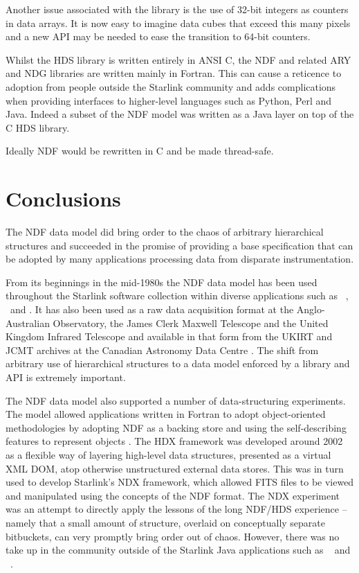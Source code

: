 \documentclass[final,authoryear,5p,times,twocolumn]{elsarticle}
\begin{document}
Another issue associated with the library is the use of 32-bit
integers as counters in data arrays. It is now easy to imagine data
cubes that exceed this many pixels and a new API may be needed to ease
the transition to 64-bit counters.

Whilst the HDS library is written entirely in ANSI C, the NDF and
related ARY \citep{SUN11} and NDG \citep{SUN2} libraries are written
mainly in Fortran.
This can cause a reticence to adoption from people outside the Starlink community and
adds complications when providing interfaces to higher-level languages
such as Python, Perl and Java. Indeed a subset of the NDF model  was
written as a Java layer on top of the C HDS library.

Ideally NDF would be rewritten in C and be made thread-safe.

\section{Conclusions}
\label{sec:conclusion}

The NDF data model did bring order to the chaos of arbitrary
hierarchical structures and succeeded in the
promise of providing a base specification that can be adopted by many
applications processing data from disparate instrumentation.

From its beginnings in the mid-1980s the NDF data model has been used
throughout the Starlink software collection within diverse
applications such as \smurf\ \citep{2013MNRAS.430.2545C},
\ccdpack\, \gaia\ and \KAPPA.
It has also been used as a raw data acquisition format at the
Anglo-Australian Observatory, the James Clerk Maxwell Telescope and the United Kingdom Infrared
Telescope and available in that form
from the UKIRT and JCMT archives at the Canadian Astronomy Data Centre
\citep{2008ASPC..394..450E,P01_adassxxiii}. The shift from arbitrary
use of hierarchical structures to a data model enforced by a library
and API is extremely important.

The NDF data model also supported a number of data-structuring
experiments.
The model allowed applications written in Fortran to
adopt object-oriented methodologies by adopting NDF as a backing store
and using the self-describing features to represent objects
\citep{1993ASPC...52..199B}.
The HDX framework \citep{2003ASPC..295..221G} was developed around 2002 as a flexible
way of layering high-level data structures, presented as a virtual XML
DOM, atop otherwise unstructured external data stores.  This was in
turn used to develop Starlink's NDX framework, which allowed FITS
files to be viewed and manipulated using the concepts of the NDF
format.  The NDX experiment was an attempt to directly apply the
lessons of the long NDF/HDS experience -- namely that a small amount of
structure, overlaid on conceptually separate bitbuckets, can very
promptly bring order out of chaos.
However, there was no take up in the community outside of the Starlink Java applications
such as \treeview\ \citep{2003ASPC..295..445B} and
\splat\ \citep[][ascl:1402.007]{2005ASPC..347...22D}.
\end{document}
